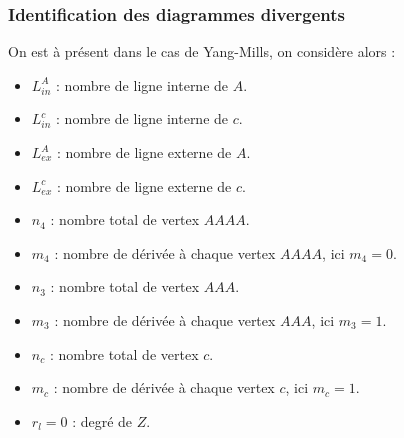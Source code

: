 \documentclass[a4paper,11pt]{article}
\theoremstyle{plain}
\theoremstyle{definition}
\theoremstyle{remark}
\numberwithin{equation}{section}
\numberwithin{equation}{subsection}
\numberwithin{figure}{section}
\begin{document}
\subsubsection{Identification des diagrammes divergents}

\noindent
On est à présent  dans le cas de Yang-Mills, on considère alors :
\begin{itemize}
\renewcommand{\labelitemi}{$\cdot$}
 \item $L^{A}_{in}$ : nombre de ligne interne de $A$.
 \item $L^{c}_{in}$ : nombre de ligne interne de $c$.
 \item $L^{A}_{ex}$ : nombre de ligne externe de $A$.
 \item $L^{c}_{ex}$ : nombre de ligne externe de $c$.
 \item $n_{4}$ : nombre total de vertex $AAAA$.
 \item $m_{4}$ : nombre de dérivée à chaque vertex $AAAA$, ici $m_{4}=0$.
 \item $n_{3}$ : nombre total de vertex $AAA$.
 \item $m_{3}$ : nombre de dérivée à chaque vertex $AAA$, ici $m_{3}=1$.
 \item $n_{c}$ : nombre total de vertex $c$.
 \item $m_{c}$ : nombre de dérivée à chaque vertex $c$, ici $m_{c}=1$.
 \item $r_{l}=0$ : degré de $Z$.
\end{itemize}
\end{document}
